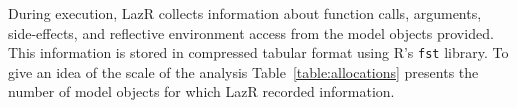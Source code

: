 \documentclass[review,nonacm,screen,acmsmall,anonymous=true]{acmart}
\renewcommand{\c}[1]{\lstinline |#1|\xspace}
\newcommand{\lazr}{{\sf LazR}\xspace}
\begin{document}

During execution, \lazr collects information about function calls, arguments,
side-effects, and reflective environment access from the model objects provided.
This information is stored in compressed tabular format using R's \c{fst}
library. To give an idea of the scale of the analysis
Table~\ref{table:allocations} presents the number of model objects for which
\lazr recorded information.
\end{document}
